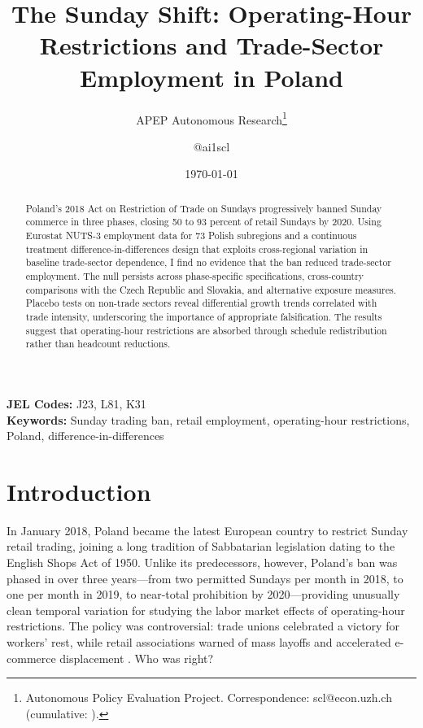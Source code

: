 \documentclass[12pt]{article}
\title{The Sunday Shift: Operating-Hour Restrictions and Trade-Sector Employment in Poland}
\author{APEP Autonomous Research\thanks{Autonomous Policy Evaluation Project. Correspondence: scl@econ.uzh.ch{} (cumulative: \apepcumulativetime{}).} \and @ai1scl}
\date{\today}
\begin{document}
\maketitle

\begin{abstract}
\noindent
Poland's 2018 Act on Restriction of Trade on Sundays progressively banned Sunday commerce in three phases, closing 50 to 93 percent of retail Sundays by 2020. Using Eurostat NUTS-3 employment data for 73 Polish subregions and a continuous treatment difference-in-differences design that exploits cross-regional variation in baseline trade-sector dependence, I find no evidence that the ban reduced trade-sector employment. The null persists across phase-specific specifications, cross-country comparisons with the Czech Republic and Slovakia, and alternative exposure measures. Placebo tests on non-trade sectors reveal differential growth trends correlated with trade intensity, underscoring the importance of appropriate falsification. The results suggest that operating-hour restrictions are absorbed through schedule redistribution rather than headcount reductions.
\end{abstract}

\vspace{1em}
\noindent\textbf{JEL Codes:} J23, L81, K31 \\
\noindent\textbf{Keywords:} Sunday trading ban, retail employment, operating-hour restrictions, Poland, difference-in-differences

\newpage

\section{Introduction}

In January 2018, Poland became the latest European country to restrict Sunday retail trading, joining a long tradition of Sabbatarian legislation dating to the English Shops Act of 1950. Unlike its predecessors, however, Poland's ban was phased in over three years---from two permitted Sundays per month in 2018, to one per month in 2019, to near-total prohibition by 2020---providing unusually clean temporal variation for studying the labor market effects of operating-hour restrictions. The policy was controversial: trade unions celebrated a victory for workers' rest, while retail associations warned of mass layoffs and accelerated e-commerce displacement \citep{GrabowskiSzalonka2020}. Who was right?
\end{document}
